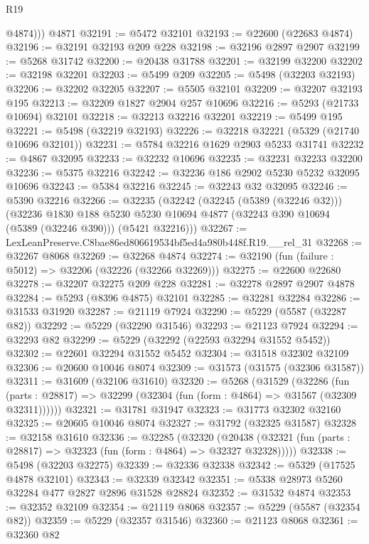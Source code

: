 \begin{lexlean}{R19}
\begin{coremodule}
          @4874)))
    @4871
@32191 := @5472 @32101
@32193 := @22600 (@22683 @4874)
@32196 := @32191 @32193 @209 @228
@32198 := @32196 @2897 @2907
@32199 := @5268 @31742
@32200 := @20438 @31788
@32201 := @32199 @32200
@32202 := @32198 @32201
@32203 := @5499 @209
@32205 := @5498 (@32203 @32193)
@32206 := @32202 @32205
@32207 := @5505 @32101
@32209 := @32207 @32193 @195
@32213 := @32209 @1827 @2904 @257 @10696
@32216 := @5293 (@21733 @10694) @32101
@32218 := @32213 @32216 @32201
@32219 := @5499 @195
@32221 := @5498 (@32219 @32193)
@32226 := @32218 @32221 (@5329 (@21740 @10696 @32101))
@32231 := @5784 @32216 @1629 @2903 @5233 @31741
@32232 := @4867 @32095
@32233 := @32232 @10696
@32235 := @32231 @32233 @32200
@32236 := @5375 @32216
@32242 := @32236 @186 @2902 @5230 @5232 @32095 @10696
@32243 := @5384 @32216
@32245 := @32243 @32 @32095
@32246 := @5390 @32216
@32266 := @32235
    (@32242
      (@32245 (@5389 (@32246 @32)))
      (@32236
        @1830
        @188
        @5230
        @5230
        @10694
        @4877
        (@32243 @390 @10694 (@5389 (@32246 @390)))
        (@5421 @32216)))
@32267 := LexLeanPreserve.C8bae86ed806619534bf5ed4a980b448f.R19.__rel_31
@32268 := @32267 @8068
@32269 := @32268 @4874
@32274 := @32190 (fun (failure : @5012) => @32206 (@32226 (@32266 @32269)))
@32275 := @22600 @22680
@32278 := @32207 @32275 @209 @228
@32281 := @32278 @2897 @2907 @4878
@32284 := @5293 (@8396 @4875) @32101
@32285 := @32281 @32284
@32286 := @31533 @31920
@32287 := @21119 @7924
@32290 := @5229 (@5587 (@32287 @82))
@32292 := @5229 (@32290 @31546)
@32293 := @21123 @7924
@32294 := @32293 @82
@32299 := @5229 (@32292 (@22593 @32294 @31552 @5452))
@32302 := @22601 @32294 @31552 @5452
@32304 := @31518 @32302 @32109
@32306 := @20600 @10046 @8074
@32309 := @31573 (@31575 (@32306 @31587))
@32311 := @31609 (@32106 @31610)
@32320 := @5268
    (@31529
      (@32286
        (fun (parts : @28817) => @32299 (@32304 (fun (form : @4864) => @31567 (@32309 @32311))))))
@32321 := @31781 @31947
@32323 := @31773 @32302 @32160
@32325 := @20605 @10046 @8074
@32327 := @31792 (@32325 @31587)
@32328 := @32158 @31610
@32336 := @32285
    (@32320
      (@20438 (@32321 (fun (parts : @28817) => @32323 (fun (form : @4864) => @32327 @32328)))))
@32338 := @5498 (@32203 @32275)
@32339 := @32336 @32338
@32342 := @5329 (@17525 @4878 @32101)
@32343 := @32339 @32342
@32351 := @5338 @28973 @5260 @32284 @477 @2827 @2896 @31528 @28824
@32352 := @31532 @4874
@32353 := @32352 @32109
@32354 := @21119 @8068
@32357 := @5229 (@5587 (@32354 @82))
@32359 := @5229 (@32357 @31546)
@32360 := @21123 @8068
@32361 := @32360 @82

\end{coremodule}
\end{lexlean}
